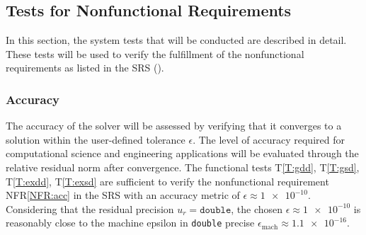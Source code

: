 \documentclass[12pt, titlepage]{article}
\newcounter{testnum} %
\newcommand{\tref}[1]{T\ref{#1}}
\newcommand{\nfrref}[1]{NFR\ref{#1}}
\begin{document}
\subsection{Tests for Nonfunctional Requirements}





In this section, the system tests that will be conducted are described in
detail. These tests will be used to verify the fulfillment of the nonfunctional
requirements as listed in the SRS (\cite{SRS}).

\subsubsection{Accuracy}

The accuracy of the solver will be assessed by verifying that it converges to a
solution within the user-defined tolerance \(\epsilon\). The level of accuracy
required for computational science and engineering applications will be
evaluated through the relative residual norm after convergence. The functional
tests \tref{T:gdd}, \tref{T:gsd}, \tref{T:exdd}, \tref{T:exsd} are sufficient to
verify the nonfunctional requirement \nfrref{NFR:acc} in the SRS with an
accuracy metric of \(\epsilon \approx \num{1e-10}\). Considering that the
residual precision \(u_r = \texttt{double}\), the chosen \(\epsilon \approx
\num{1e-10}\) is reasonably close to the machine epsilon in \texttt{double}
precise \(\epsilon_\mathrm{mach} \approx \num{1.1e-16}\).


\end{document}
